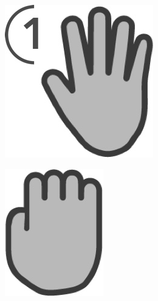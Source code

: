 \begin{figure}[htb]
	\centering
	\begin{minipage}[t]{0.15\linewidth}
		\centering
		\includegraphics[width=1\linewidth]{Pictures/5_3_hover}
		\label{fig:5_3_hover}
	\end{minipage}
	\hfill
	\begin{minipage}[t]{0.1\linewidth}
		\centering
		\includegraphics[width=1\linewidth]{Pictures/5_3_fist}

\end{minipage}
\end{figure}
